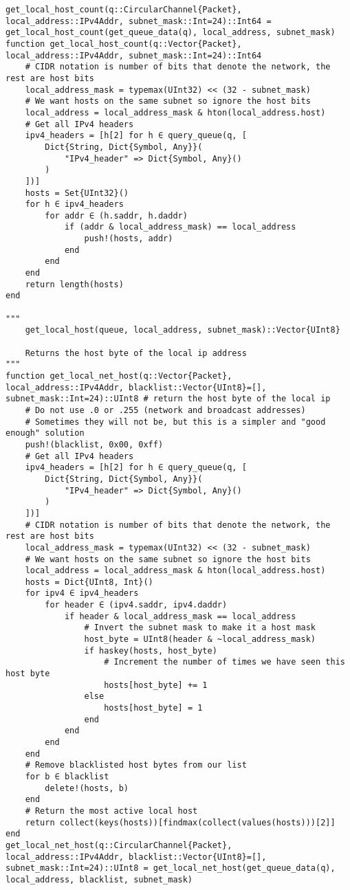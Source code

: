 \begin{lstlisting}[language=JuliaLocal, style=julia]
get_local_host_count(q::CircularChannel{Packet}, local_address::IPv4Addr, subnet_mask::Int=24)::Int64 = get_local_host_count(get_queue_data(q), local_address, subnet_mask)
function get_local_host_count(q::Vector{Packet}, local_address::IPv4Addr, subnet_mask::Int=24)::Int64
    # CIDR notation is number of bits that denote the network, the rest are host bits
    local_address_mask = typemax(UInt32) << (32 - subnet_mask)
    # We want hosts on the same subnet so ignore the host bits
    local_address = local_address_mask & hton(local_address.host)
    # Get all IPv4 headers
    ipv4_headers = [h[2] for h ∈ query_queue(q, [
        Dict{String, Dict{Symbol, Any}}(
            "IPv4_header" => Dict{Symbol, Any}()
        )
    ])]
    hosts = Set{UInt32}()
    for h ∈ ipv4_headers
        for addr ∈ (h.saddr, h.daddr)
            if (addr & local_address_mask) == local_address
                push!(hosts, addr)
            end
        end
    end
    return length(hosts)
end

"""
    get_local_host(queue, local_address, subnet_mask)::Vector{UInt8}

    Returns the host byte of the local ip address
"""
function get_local_net_host(q::Vector{Packet}, local_address::IPv4Addr, blacklist::Vector{UInt8}=[], subnet_mask::Int=24)::UInt8 # return the host byte of the local ip
    # Do not use .0 or .255 (network and broadcast addresses)
    # Sometimes they will not be, but this is a simpler and "good enough" solution
    push!(blacklist, 0x00, 0xff)
    # Get all IPv4 headers
    ipv4_headers = [h[2] for h ∈ query_queue(q, [
        Dict{String, Dict{Symbol, Any}}(
            "IPv4_header" => Dict{Symbol, Any}()
        )
    ])]
    # CIDR notation is number of bits that denote the network, the rest are host bits
    local_address_mask = typemax(UInt32) << (32 - subnet_mask)
    # We want hosts on the same subnet so ignore the host bits
    local_address = local_address_mask & hton(local_address.host)
    hosts = Dict{UInt8, Int}()
    for ipv4 ∈ ipv4_headers
        for header ∈ (ipv4.saddr, ipv4.daddr)
            if header & local_address_mask == local_address
                # Invert the subnet mask to make it a host mask
                host_byte = UInt8(header & ~local_address_mask)
                if haskey(hosts, host_byte)
                    # Increment the number of times we have seen this host byte
                    hosts[host_byte] += 1
                else
                    hosts[host_byte] = 1
                end
            end
        end
    end
    # Remove blacklisted host bytes from our list
    for b ∈ blacklist
        delete!(hosts, b)
    end
    # Return the most active local host
    return collect(keys(hosts))[findmax(collect(values(hosts)))[2]]
end
get_local_net_host(q::CircularChannel{Packet}, local_address::IPv4Addr, blacklist::Vector{UInt8}=[], subnet_mask::Int=24)::UInt8 = get_local_net_host(get_queue_data(q), local_address, blacklist, subnet_mask)

\end{lstlisting}

